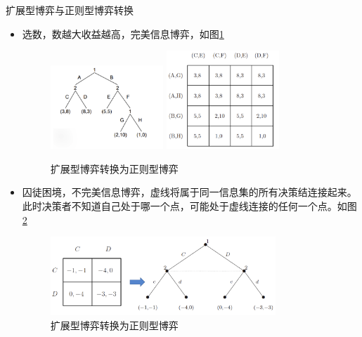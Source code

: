 \begin{remark}
    扩展型博弈与正则型博弈转换
    \begin{itemize}
        \item 选数，数越大收益越高，完美信息博弈，如图\ref{fig10}
        \begin{figure}[htbp]
            \centering
            \includegraphics[width=0.4\textwidth]{./figure/fig9.png}
            \includegraphics[width=0.4\textwidth]{./figure/fig10.png}
            \caption{扩展型博弈转换为正则型博弈\label{fig10}}
        \end{figure}
        \item 囚徒困境，不完美信息博弈，虚线将属于同一信息集的所有决策结连接起来。此时决策者不知道自己处于哪一个点，可能处于虚线连接的任何一个点。如图\ref{fig11}
        \begin{figure}[htbp]
            \centering
            \includegraphics[width=0.8\textwidth]{./figure/fig11.png}
            \caption{扩展型博弈转换为正则型博弈\label{fig11}}
        \end{figure}
    \end{itemize}
\end{remark}


